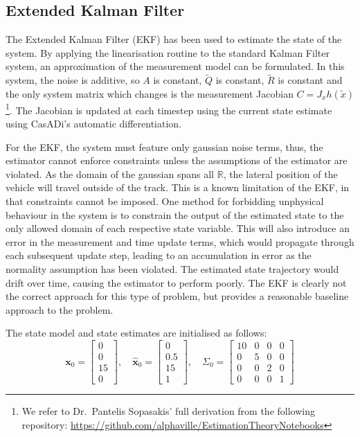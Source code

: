 \subsection{Extended Kalman Filter}

The Extended Kalman Filter (EKF) has been used to estimate the state of the system. By applying the linearisation routine to the standard Kalman Filter system, an approximation of the measurement model can be formulated. In this system, the noise is additive, so $A$ is constant, $\tilde{Q}$ is constant, $\tilde{R}$ is constant and the only system matrix which changes is the measurement Jacobian $C = J_x h(\tilde{x})$
\footnote{
    We refer to Dr.\ Pantelis Sopasakis' full derivation from the following repository: \url{https://github.com/alphaville/EstimationTheoryNotebooks}
}. The Jacobian is updated at each timestep using the current state estimate using CasADi's automatic differentiation.

For the EKF, the system must feature only gaussian noise terms, thus, the estimator cannot enforce constraints unless the assumptions of the estimator are violated. As the domain of the gaussian spans all $\mathbb{R}$, the lateral position of the vehicle will travel outside of the track. This is a known limitation of the EKF, in that constraints cannot be imposed. One method for forbidding unphysical behaviour in the system is to constrain the output of the estimated state to the only allowed domain of each respective state variable. This will also introduce an error in the measurement and time update terms, which would propagate through each subsequent update step, leading to an accumulation in error as the normality assumption has been violated. The estimated state trajectory would drift over time, causing the estimator to perform poorly.
The EKF is clearly not the correct approach for this type of problem, but provides a reasonable baseline approach to the problem.

The state model and state estimates are initialised as follows:
\begin{equation}
\label{eq:initial-conditions}
\mathbf{x}_0 = \begin{bmatrix} 0 \\ 0 \\ 15 \\ 0 \end{bmatrix}, \quad
\hat{\mathbf{x}}_0 = \begin{bmatrix} 0 \\ 0.5 \\ 15 \\ 1 \end{bmatrix}, \quad
\Sigma_0 = \begin{bmatrix} 10 & 0 & 0 & 0 \\ 0 & 5 & 0 & 0 \\ 0 & 0 & 2 & 0 \\ 0 & 0 & 0 & 1 \end{bmatrix}
\end{equation}